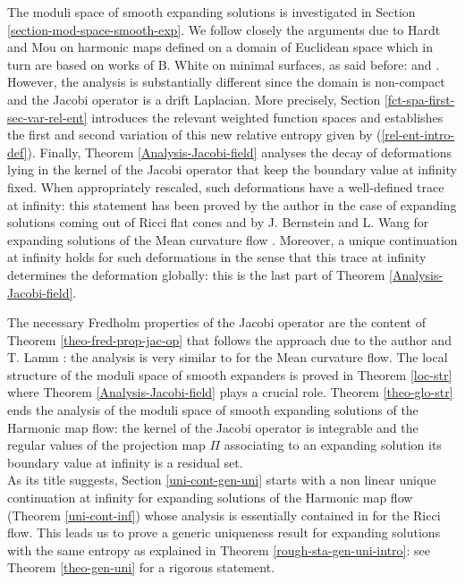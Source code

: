 \documentclass[a4paper,11pt,reqno]{amsart}
\begin{document}
The moduli space of smooth expanding solutions is investigated in Section \ref{section-mod-space-smooth-exp}. We follow closely the arguments due to Hardt and Mou \cite{Har-Mou} on harmonic maps defined on a domain of Euclidean space which in turn are based on works of B. White on minimal surfaces, as said before: \cite{Whi-para-ell-fct} and \cite{White-var-met}. However, the analysis is substantially different since the domain is non-compact and the Jacobi operator is a drift Laplacian. More precisely, Section \ref{fct-spa-first-sec-var-rel-ent} introduces the relevant weighted function spaces and establishes the first and second variation of this new relative entropy given by (\ref{rel-ent-intro-def}). Finally, Theorem \ref{Analysis-Jacobi-field} analyses the decay of deformations lying in the kernel of the Jacobi operator that keep the boundary value at infinity fixed. When appropriately rescaled, such deformations have a well-defined trace at infinity: this statement has been proved by the author \cite{Uni-Con-Egs-Der} in the case of expanding solutions coming out of Ricci flat cones and by J. Bernstein and L. Wang for expanding solutions of the Mean curvature flow \cite{Ber-Wan-MCF}. Moreover, a unique continuation at infinity holds for such deformations in the sense that this trace at infinity determines the deformation globally: this is the last part of Theorem \ref{Analysis-Jacobi-field}.

The necessary Fredholm properties of the Jacobi operator are the content of Theorem \ref{theo-fred-prop-jac-op} that follows the approach due to the author and T. Lamm \cite{Der-Lam-HMF}: the analysis is very similar to \cite{Ber-Wan-MCF} for the Mean curvature flow. The local structure of the moduli space of smooth expanders is proved in Theorem \ref{loc-str} where Theorem \ref{Analysis-Jacobi-field} plays a crucial role. Theorem \ref{theo-glo-str} ends the analysis of the moduli space of smooth expanding solutions of the Harmonic map flow: the kernel of the Jacobi operator is integrable and the regular values of the projection map $\Pi$ associating to an expanding solution its boundary value at infinity is a residual set. \\

As its title suggests, Section \ref{uni-cont-gen-uni} starts with a non linear unique continuation at infinity for expanding solutions of the Harmonic map flow (Theorem \ref{uni-cont-inf}) whose analysis is essentially contained in \cite{Uni-Con-Egs-Der} for the Ricci flow. This leads us to prove a generic uniqueness result for expanding solutions with the same entropy as explained in Theorem \ref{rough-sta-gen-uni-intro}: see Theorem \ref{theo-gen-uni} for a rigorous statement.\\
\end{document}
